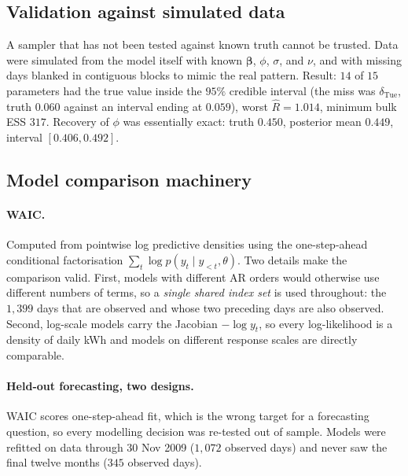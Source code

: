 \documentclass[11pt]{article}
\begin{document}
\subsection{Validation against simulated data}

A sampler that has not been tested against known truth cannot be trusted. Data
were simulated from the model itself with known $\boldsymbol\beta$, $\phi$,
$\sigma$, and $\nu$, and with missing days blanked in contiguous blocks to mimic
the real pattern. Result: $14$ of $15$ parameters had the true value inside the
$95\%$ credible interval (the miss was $\delta_{\text{Tue}}$, truth $0.060$
against an interval ending at $0.059$), worst $\hat R = 1.014$, minimum bulk
ESS $317$. Recovery of $\phi$ was essentially exact: truth $0.450$, posterior
mean $0.449$, interval $[0.406, 0.492]$.

\subsection{Model comparison machinery}
\label{sec:compare}

\paragraph{WAIC.} Computed from pointwise log predictive densities using the
one-step-ahead conditional factorisation $\sum_t \log p(y_t \mid y_{<t},\theta)$.
Two details make the comparison valid. First, models with different AR orders
would otherwise use different numbers of terms, so a \emph{single shared index
set} is used throughout: the $1{,}399$ days that are observed and whose two
preceding days are also observed. Second, log-scale models carry the Jacobian
$-\log y_t$, so every log-likelihood is a density of daily kWh and models on
different response scales are directly comparable.

\paragraph{Held-out forecasting, two designs.} WAIC scores one-step-ahead fit,
which is the wrong target for a forecasting question, so every modelling
decision was re-tested out of sample. Models were refitted on data through
30 Nov 2009 ($1{,}072$ observed days) and never saw the final twelve months
($345$ observed days).
\end{document}

